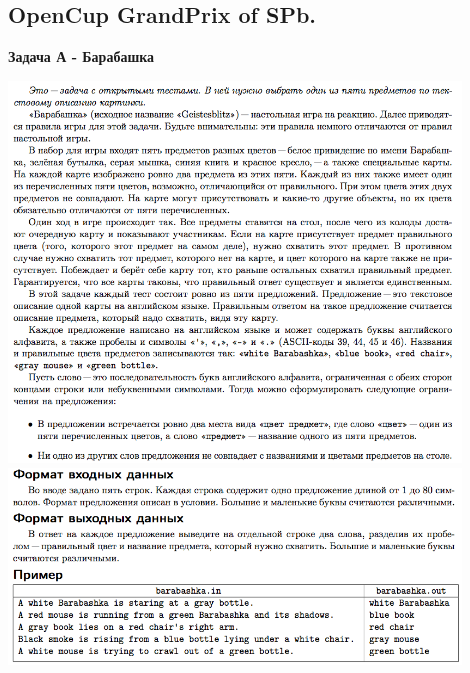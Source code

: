 \documentclass[a4paper,12pt]{article}
\begin{document}
%
%
\newpage
\subsection{OpenCup GrandPrix of SPb.}

\textbf{{\large Задача А - Барабашка}} \\
\begin{center}
\includegraphics[width=0.9\textwidth]{OC_SPB/OC_SPB_A1.png}\\ [1cm]
\includegraphics[width=0.9\textwidth]{OC_SPB/OC_SPB_A2.png}\\ [1cm]
\end{center}
\newpage
\end{document}
